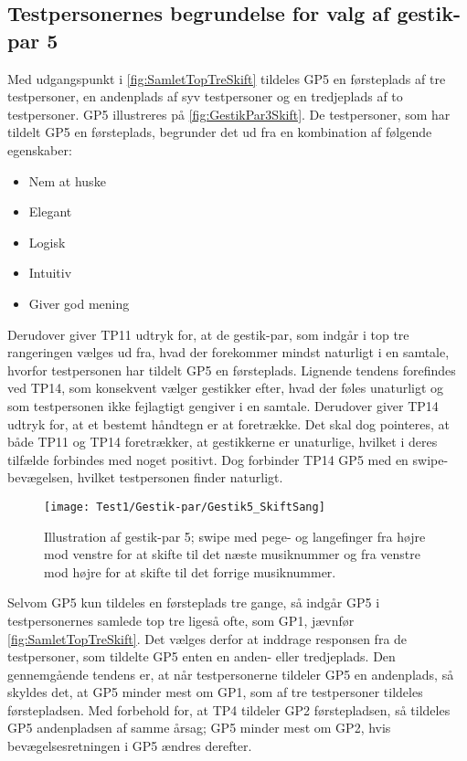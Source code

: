 \subsection{Testpersonernes begrundelse for valg af gestik-par 5}
\label{TestresultaterValgAfGestikkerBegrundelseGP5Skift}
%
Med udgangspunkt i \autoref{fig:SamletTopTreSkift} tildeles GP5 en førsteplads af tre testpersoner, en andenplads af syv testpersoner og en tredjeplads af to testpersoner. GP5 illustreres på \autoref{fig:GestikPar3Skift}. De testpersoner, som har tildelt GP5 en førsteplads, begrunder det ud fra en kombination af følgende egenskaber: 
%
\begin{multicols}{3}
    \begin{itemize}
        \item Nem at huske
        \item Elegant
        \item Logisk
        \item Intuitiv
        \item Giver god mening
\end{itemize}
\end{multicols}
\noindent
%
Derudover giver TP11 udtryk for, at de gestik-par, som indgår i top tre rangeringen vælges ud fra, hvad der forekommer mindst naturligt i en samtale, hvorfor testpersonen har tildelt GP5 en førsteplads. Lignende tendens forefindes ved TP14, som konsekvent vælger gestikker efter, hvad der føles unaturligt og som testpersonen ikke fejlagtigt gengiver i en samtale. Derudover giver TP14 udtryk for, at et bestemt håndtegn er at foretrække. Det skal dog pointeres, at både TP11 og TP14 foretrækker, at gestikkerne er unaturlige, hvilket i deres tilfælde forbindes med noget positivt. Dog forbinder TP14 GP5 med en swipe-bevægelsen, hvilket testpersonen finder naturligt.  
%
\begin{figure}[H]
	\centering
	\texttt{[image: Test1/Gestik-par/Gestik5\_SkiftSang]}
	\caption{Illustration af gestik-par 5; swipe med pege- og langefinger fra højre mod venstre for at skifte til det næste musiknummer og fra venstre mod højre for at skifte til det forrige musiknummer.}
	\label{fig:GestikPar5Skift}
\end{figure}
\noindent
%
Selvom GP5 kun tildeles en førsteplads tre gange, så indgår GP5 i testpersonernes samlede top tre ligeså ofte, som GP1, jævnfør \autoref{fig:SamletTopTreSkift}. Det vælges derfor at inddrage responsen fra de testpersoner, som tildelte GP5 enten en anden- eller tredjeplads.\blankline
%
Den gennemgående tendens er, at når testpersonerne tildeler GP5 en andenplads, så skyldes det, at GP5 minder mest om GP1, som af tre testpersoner tildeles førstepladsen. Med forbehold for, at TP4 tildeler GP2 førstepladsen, så tildeles GP5 andenpladsen af samme årsag; GP5 minder mest om GP2, hvis bevægelsesretningen i GP5 ændres derefter. 

